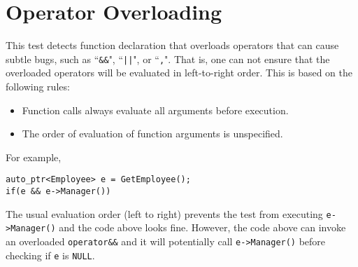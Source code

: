 %
%

\section{Operator Overloading}
\label{OperatorOverloading::overview}

This test detects function declaration that overloads operators that can cause subtle bugs, such as ``\texttt{\&\&}", ``\texttt{||}", or ``\texttt{,}".
That is, one can not ensure that the overloaded operators will be evaluated in left-to-right order. This is based on the following rules:
\begin{itemize}
\item Function calls always evaluate all arguments before execution.
\item The order of evaluation of function arguments is unspecified.
\end{itemize}

For example, 
\begin{verbatim}
auto_ptr<Employee> e = GetEmployee();
if(e && e->Manager())
\end{verbatim}

The usual evaluation order (left to right) prevents the test from executing \texttt{e->Manager()} and the code above looks fine. However, the code above can invoke an overloaded \texttt{operator\&\&} and it will potentially call \texttt{e->Manager()} before checking if \texttt{e} is \texttt{NULL}.

